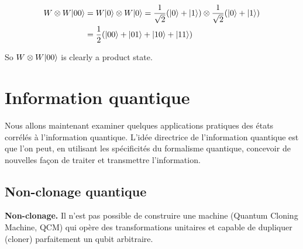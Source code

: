 \begin{footnotesize}
\begin{solution}
\begin{equation}
\begin{split}
 W\otimes W\vert00\rangle & =W\vert0\rangle\otimes W\vert0\rangle=\frac{1}{\sqrt{2}}(\vert0\rangle+
\vert1\rangle)\otimes\frac{1}{\sqrt{2}}(\vert0\rangle+\vert1\rangle)\\
 & =\frac{1}{2}(\vert00\rangle+\vert01\rangle+\vert10\rangle+\vert11\rangle)
 \end{split}
\end{equation}
\end{solution}
So $W\otimes W\vert00\rangle$ is clearly a product state.

\end{footnotesize}

\section{Information quantique}
\label{sec:IQ}

Nous allons maintenant examiner quelques applications pratiques des états
corrélés à l'information quantique. L'idée directrice de l'information quantique
est que l'on peut, en utilisant les spécificités du formalisme quantique,
concevoir de nouvelles façon de traiter et transmettre l'information.

\subsection{Non-clonage quantique}

\medskip\colorbox[gray]{0.8}{
\parbox[c]{0.9\textwidth}{
\begin{theorem}
\textbf{Non-clonage.} Il n'est pas possible de construire une machine (Quantum
Cloning Machine, QCM) qui opère des transformations unitaires et capable de
dupliquer (cloner) parfaitement un qubit arbitraire.
\end{theorem}
}}
\medskip

